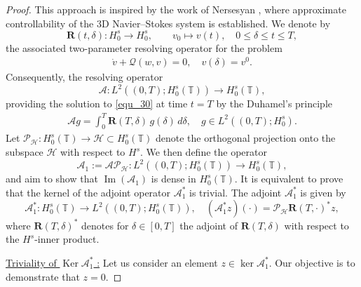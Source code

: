 \documentclass[10pt, reqno]{amsart}
\numberwithin{equation}{section}
\begin{document}
\begin{proof}
This approach is inspired by the work of Nersesyan \cite{Nersesyan_2021_Sicon}, where approximate controllability of the 3D Navier–Stokes system is established. We denote by  
\[
\mathbf{R}(t, \delta) : H^s_0 \to H^s_0, \qquad v_0 \mapsto v(t),  \quad 0 \leq \delta \leq t \leq T,
\]  
the associated two-parameter resolving operator for the problem  
\begin{align}\label{linearized_burger_start_at_delta}
	\dot{v} + \mathcal{Q}(w, v) = 0, \quad v(\delta) = v^0.
\end{align}  
Consequently, the resolving operator 
\[
\mathcal{A} : L^2((0, T); H^s_0(\mathbb{T})) \to H^s_0(\mathbb{T}), 
\]
 providing the solution to \eqref{equ_30} at time $t = T$ by the Duhamel's principle 
\begin{align*}
\mathcal{A} g = \int_0^T \mathbf{R}(T, \delta)\, g(\delta) \, d\delta, \quad g \in L^2((0, T); H^s_0).
\end{align*}
Let \( \mathcal{P}_{\mathcal{H}} : H^s_0(\mathbb{T}) \to \mathcal{H} \subset H^s_0(\mathbb{T}) \) denote the orthogonal projection onto the subspace \( \mathcal{H} \) with respect to $H^s$. We then define the operator  
\[
\mathcal{A}_1 := \mathcal{A} \mathcal{P}_{\mathcal{H}} : L^2((0, T); H^s_0(\mathbb{T})) \to H^s_0(\mathbb{T}),
\]
and aim to show that \( \operatorname{Im}(\mathcal{A}_1) \) is dense in \( H^s_0(\mathbb{T}) \). It is equivalent to prove that the kernel of the adjoint operator \( \mathcal{A}_1^* \) is trivial. The adjoint \( \mathcal{A}_1^* \) is given by  
\[
\mathcal{A}_1^* : H^s_0(\mathbb{T}) \to L^2((0, T); H^s_0(\mathbb{T})), \quad (\mathcal{A}_1^*z) (\cdot) = \mathcal{P}_{\mathcal{H}} \mathbf{R}(T, \cdot)^* z,
\]
where  \( \mathbf{R}(T, \delta)^* \) denotes for $\delta \in [0, T]$ the adjoint of \( \mathbf{R}(T, \delta) \) with respect to the \( H^s \)-inner product.

\underline{Triviality of $\operatorname{Ker} \mathcal{A}_1^*$ :} Let us consider an element \( z \in \ker \mathcal{A}_1^* \). Our objective is to demonstrate that \( z = 0 \). 


\end{proof}
\end{document}
